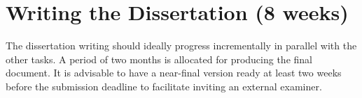 \section{Writing the Dissertation (8 weeks)}

The dissertation writing should ideally progress incrementally in parallel with the other tasks. A period of two months is allocated for producing the final document. It is advisable to have a near-final version ready at least two weeks before the submission deadline to facilitate inviting an external examiner.




